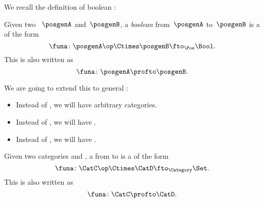 We recall the definition of boolean :

\begin{ctdefinition}
    \label{def:boolean-profunctor-again}
    Given two ~$\posgenA$ and~$\posgenB$, a \emph{boolean } from~$\posgenA$ to~$\posgenB$ is a  of the form
    \begin{equation}
        \label{eq:boolean-profunctor-funa}
        \funa\colon \posgenA\op \Ctimes \posgenB \fto_{\Pos} \Bool.
    \end{equation}
    This is also written as
    \begin{equation}
        \funa\colon \posgenA \profto \posgenB.
    \end{equation}
\end{ctdefinition}

We are going to extend this to general :
\begin{itemize}
    \item Instead of , we will have arbitrary categories.
    \item Instead of \Bool, we will have \Set.
    \item Instead of  , we will have .
\end{itemize}

\begin{ctdefinition}[Profunctors]
    \label{def:profunctor}
    Given two categories \CatC and \CatD, a  from \CatC to \CatD is a  of the form
    \begin{equation}
        \label{eq:profunctors-def-1}
        \funa\colon \CatC\op \Ctimes \CatD \fto_{\Category} \Set.
    \end{equation}
    This is also written as
    \begin{equation}
        \label{eq:profunctors-def-2}
        \funa\colon \CatC \profto \CatD.
    \end{equation}
\end{ctdefinition}

